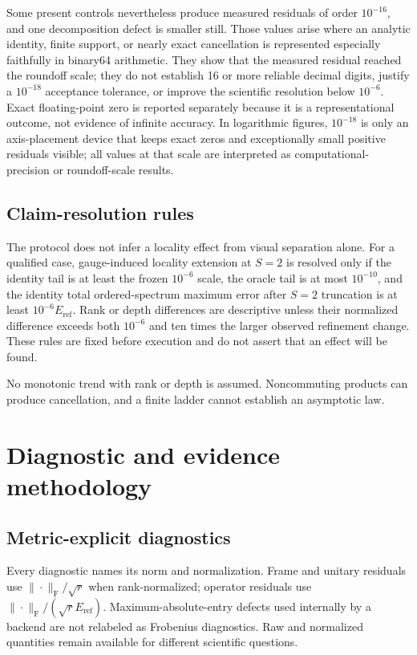 \documentclass[11pt]{article}
\newcommand{\Eref}{E_{\mathrm{ref}}}
\newcommand{\Frob}{\mathrm F}
\begin{document}
Some present controls nevertheless produce measured residuals of order $10^{-16}$, and
one decomposition defect is smaller still. Those values arise where an analytic identity,
finite support, or nearly exact cancellation is represented especially faithfully in
binary64 arithmetic. They show that the measured residual reached the roundoff scale;
they do not establish 16 or more reliable decimal digits, justify a $10^{-18}$ acceptance
tolerance, or improve the scientific resolution below $10^{-6}$. Exact floating-point
zero is reported separately because it is a representational outcome, not evidence of
infinite accuracy. In logarithmic figures, $10^{-18}$ is only an axis-placement device
that keeps exact zeros and exceptionally small positive residuals visible; all values at
that scale are interpreted as computational-precision or roundoff-scale results.

\subsection{Claim-resolution rules}

The protocol does not infer a locality effect from visual separation alone. For a
qualified case, gauge-induced locality extension at $S=2$ is resolved only if the
identity tail is at least the frozen $10^{-6}$ scale, the oracle tail is at most
$10^{-10}$, and the identity total ordered-spectrum maximum error after $S=2$
truncation is at least $10^{-6}E_{\mathrm{ref}}$. Rank or depth differences are descriptive unless their normalized difference
exceeds both $10^{-6}$ and ten times the larger observed refinement change. These rules
are fixed before execution and do not assert that an effect will be found.

No monotonic trend with rank or depth is assumed. Noncommuting products can produce
cancellation, and a finite ladder cannot establish an asymptotic law.

\section{Diagnostic and evidence methodology}
\label{sec:diagnostics}

\subsection{Metric-explicit diagnostics}

Every diagnostic names its norm and normalization. Frame and unitary residuals use
$\|\cdot\|_\Frob/\sqrt r$ when rank-normalized; operator residuals use
$\|\cdot\|_\Frob/(\sqrt r\Eref)$. Maximum-absolute-entry defects used internally by a
backend are not relabeled as Frobenius diagnostics. Raw and normalized quantities remain
available for different scientific questions.
\end{document}
